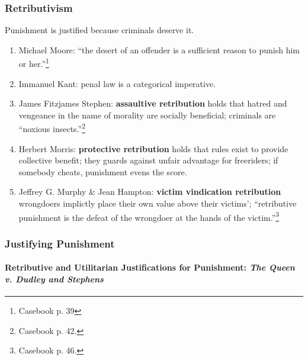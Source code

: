 \subsubsection{Retributivism}

Punishment is justified because criminals deserve it.

\begin{enumerate}
    \item Michael Moore: ``the desert of an offender is a sufficient reason to punish him or her.''\footnote{Casebook p. 39}
    \item Immanuel Kant: penal law is a categorical imperative.
    \item James Fitzjames Stephen: \textbf{assaultive retribution} holds that hatred and vengeance in the name of morality are socially beneficial; criminals are ``noxious insects.''\footnote{Casebook p. 42.}
    \item Herbert Morris: \textbf{protective retribution} holds that rules exist to provide collective benefit; they guards against unfair advantage for freeriders; if somebody cheats, punishment evens the score.
    \item Jeffrey G. Murphy \& Jean Hampton: \textbf{victim vindication retribution} wrongdoers implictly place their own value above their victims'; ``retributive punishment is the defeat of the wrongdoer at the hands of the victim.''\footnote{Casebook p. 46.}
\end{enumerate}

\subsubsection{Justifying Punishment}

\paragraph{Retributive and Utilitarian Justifications for Punishment: \emph{The Queen v. Dudley and Stephens}}

